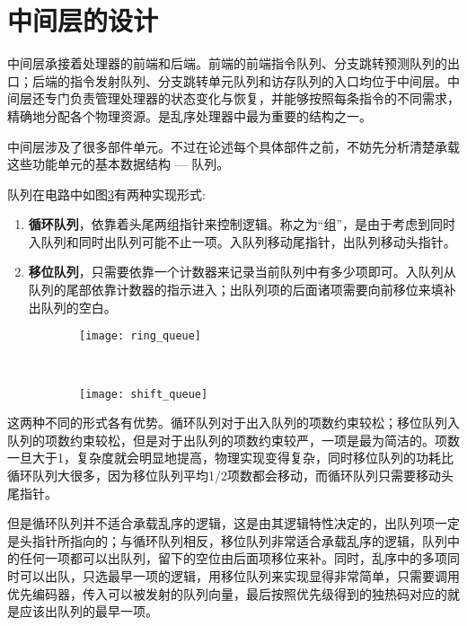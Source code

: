 \section{中间层的设计}

中间层承接着处理器的前端和后端。前端的前端指令队列、分支跳转预测队列的出口；后端的指令发射队列、分支跳转单元队列和访存队列的入口均位于中间层。中间层还专门负责管理处理器的状态变化与恢复，并能够按照每条指令的不同需求，精确地分配各个物理资源。是乱序处理器中最为重要的结构之一。

中间层涉及了很多部件单元。不过在论述每个具体部件之前，不妨先分析清楚承载这些功能单元的基本数据结构 --- 队列。

队列在电路中如图\ref{fig:queue}有两种实现形式:
\begin{enumerate}[label=(\alph*)]
	\item \textbf{循环队列}，依靠着头尾两组指针来控制逻辑。称之为``组''，是由于考虑到同时入队列和同时出队列可能不止一项。入队列移动尾指针，出队列移动头指针。
	\item \textbf{移位队列}，只需要依靠一个计数器来记录当前队列中有多少项即可。入队列从队列的尾部依靠计数器的指示进入；出队列项的后面诸项需要向前移位来填补出队列的空白。
\end{enumerate}
\begin{figure}[!htbp]
	\centering
	\begin{subfigure}[b]{0.45\textwidth}
		\texttt{[image: ring\_queue]}
		\caption{}
		\label{fig:ring_queue}
	\end{subfigure}
	~
	\begin{subfigure}[b]{0.45\textwidth}
		\texttt{[image: shift\_queue]}
		\caption{}
		\label{fig:shift_queue}
	\end{subfigure}
	\label{fig:queue}
\end{figure}

这两种不同的形式各有优势。循环队列对于出入队列的项数约束较松；移位队列入队列的项数约束较松，但是对于出队列的项数约束较严，一项是最为简洁的。项数一旦大于1，复杂度就会明显地提高，物理实现变得复杂，同时移位队列的功耗比循环队列大很多，因为移位队列平均1/2项数都会移动，而循环队列只需要移动头尾指针。

但是循环队列并不适合承载乱序的逻辑，这是由其逻辑特性决定的，出队列项一定是头指针所指向的；与循环队列相反，移位队列非常适合承载乱序的逻辑，队列中的任何一项都可以出队列，留下的空位由后面项移位来补。同时，乱序中的多项同时可以出队，只选最早一项的逻辑，用移位队列来实现显得非常简单，只需要调用优先编码器，传入可以被发射的队列向量，最后按照优先级得到的独热码对应的就是应该出队列的最早一项。

